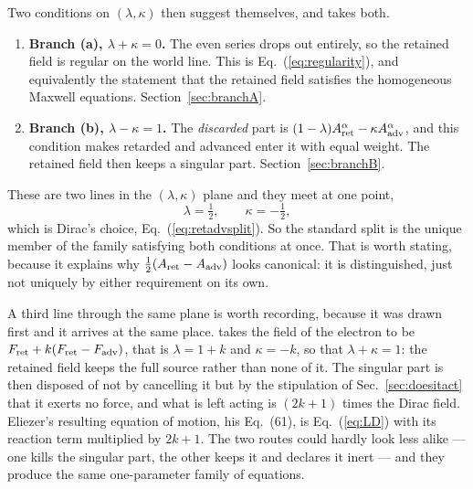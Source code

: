 \documentclass[preprint]{aastex701}
\newcommand{\Aret}{A^\alpha_{\rm ret}}
\newcommand{\Aadv}{A^\alpha_{\rm adv}}
\begin{document}
Two conditions on $(\lambda,\kappa)$ then suggest themselves, and
\citet{zhang2006} takes both.

\begin{enumerate}
\item \textbf{Branch (a), $\lambda+\kappa=0$.} The even series drops out
entirely, so the retained field is regular on the world line. This is
Eq.~(\ref{eq:regularity}), and equivalently the statement that the retained
field satisfies the homogeneous Maxwell equations. Section~\ref{sec:branchA}.
\item \textbf{Branch (b), $\lambda-\kappa=1$.} The \emph{discarded} part is
$(1-\lambda)\Aret - \kappa\Aadv$, and this condition makes retarded and
advanced enter it with equal weight. The retained field then keeps a singular
part. Section~\ref{sec:branchB}.
\end{enumerate}

These are two lines in the $(\lambda,\kappa)$ plane and they meet at one point,
\begin{equation}
\lambda = \tfrac12, \qquad \kappa = -\tfrac12 ,
\label{eq:diracpoint}
\end{equation}
which is Dirac's choice, Eq.~(\ref{eq:retadvsplit}). So the standard split is
the unique member of the family satisfying both conditions at once. That is
worth stating, because it explains why $\tfrac12(A_{\rm ret}-A_{\rm adv})$
looks canonical: it is distinguished, just not uniquely by either requirement
on its own.

A third line through the same plane is worth recording, because it was drawn
first and it arrives at the same place. \citet{eliezer1947} takes the field of
the electron to be $F_{\rm ret} + k(F_{\rm ret}-F_{\rm adv})$, that is
$\lambda = 1+k$ and $\kappa = -k$, so that $\lambda+\kappa = 1$: the retained
field keeps the full source rather than none of it. The singular part is then
disposed of not by cancelling it but by the stipulation of
Sec.~\ref{sec:doesitact} that it exerts no force, and what is left acting is
$(2k+1)$ times the Dirac field. Eliezer's resulting equation of motion, his
Eq.~(61), is Eq.~(\ref{eq:LD}) with its reaction term multiplied by $2k+1$.
The two routes could hardly look less alike --- one kills the singular part,
the other keeps it and declares it inert --- and they produce the same
one-parameter family of equations.
\end{document}
